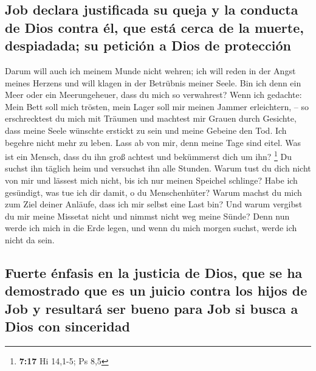 \hypertarget{job-declara-justificada-su-queja-y-la-conducta-de-dios-contra-uxe9l-que-estuxe1-cerca-de-la-muerte-despiadada-su-peticiuxf3n-a-dios-de-protecciuxf3n}{%
\subsection{Job declara justificada su queja y la conducta de Dios
contra él, que está cerca de la muerte, despiadada; su petición a Dios
de
protección}\label{job-declara-justificada-su-queja-y-la-conducta-de-dios-contra-uxe9l-que-estuxe1-cerca-de-la-muerte-despiadada-su-peticiuxf3n-a-dios-de-protecciuxf3n}}

 Darum will auch ich meinem Munde nicht wehren; ich will
reden in der Angst meines Herzens und will klagen in der Betrübnis
meiner Seele.  Bin ich denn ein Meer oder ein
Meerungeheuer, dass du mich so verwahrest?  Wenn ich
gedachte: Mein Bett soll mich trösten, mein Lager soll mir meinen Jammer
erleichtern, --  so erschrecktest du mich mit Träumen und
machtest mir Grauen durch Gesichte,  dass meine Seele
wünschte erstickt zu sein und meine Gebeine den Tod.  Ich
begehre nicht mehr zu leben. Lass ab von mir, denn meine Tage sind
eitel.  Was ist ein Mensch, dass du ihn groß achtest und
bekümmerst dich um ihn? \footnote{\textbf{7:17} Hi 14,1-5; Ps 8,5}
 Du suchst ihn täglich heim und versuchst ihn alle
Stunden.  Warum tust du dich nicht von mir und lässest
mich nicht, bis ich nur meinen Speichel schlinge?  Habe
ich gesündigt, was tue ich dir damit, o du Menschenhüter? Warum machst
du mich zum Ziel deiner Anläufe, dass ich mir selbst eine Last bin?
 Und warum vergibst du mir meine Missetat nicht und
nimmst nicht weg meine Sünde? Denn nun werde ich mich in die Erde legen,
und wenn du mich morgen suchst, werde ich nicht da sein.

\hypertarget{fuerte-uxe9nfasis-en-la-justicia-de-dios-que-se-ha-demostrado-que-es-un-juicio-contra-los-hijos-de-job-y-resultaruxe1-ser-bueno-para-job-si-busca-a-dios-con-sinceridad}{%
\subsection{Fuerte énfasis en la justicia de Dios, que se ha demostrado
que es un juicio contra los hijos de Job y resultará ser bueno para Job
si busca a Dios con
sinceridad}\label{fuerte-uxe9nfasis-en-la-justicia-de-dios-que-se-ha-demostrado-que-es-un-juicio-contra-los-hijos-de-job-y-resultaruxe1-ser-bueno-para-job-si-busca-a-dios-con-sinceridad}}

